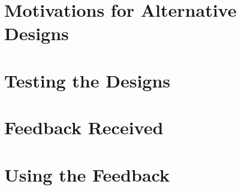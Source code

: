 \documentclass[11pt]{article}
\begin{document}
\newpage

\section{Motivations for Alternative Designs}

\section{Testing the Designs}

\section{Feedback Received}

\section{Using the Feedback}
	
\end{document}

